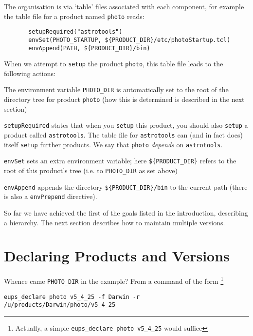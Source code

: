 \documentclass{article}
\newcommand{\code}[1]{\texttt{#1}}
\begin{document}
The organisation is via `table' files
associated with each component, for example the table file
for a product named \code{photo} reads:
\begin{verbatim}
       setupRequired("astrotools")
       envSet(PHOTO_STARTUP, ${PRODUCT_DIR}/etc/photoStartup.tcl)
       envAppend(PATH, ${PRODUCT_DIR}/bin)
\end{verbatim}

When we attempt to \code{setup} the product \code{photo}, this
table file leads to the following actions:
\begin{description}
\item
  The environment variable \code{PHOTO\_DIR} is automatically set to 
  the root of the directory tree for product \code{photo} (how this
  is determined is described in the next section)
\item
  \code{setupRequired} states that when you \code{setup} this product, you
  should also \code{setup} a product called \code{astrotools}.
  The table file for \code{astrotools} can
  (and in fact does) itself \code{setup} further products.  We say that
  \code{photo} \emph{depends} on \code{astrotools}.
\item
  \code{envSet} sets an extra environment variable; here \code{\$\{PRODUCT\_DIR\}}
  refers to the root of this product's tree (i.e. to \code{PHOTO\_DIR} as set above)
\item
  \code{envAppend} appends
  the directory \code{\$\{PRODUCT\_DIR\}/bin} to the current path (there
  is also a \code{envPrepend} directive).
\end{description}

So far we have achieved the first of the goals listed in the introduction,
describing a hierarchy.  The next section describes how to maintain
multiple versions.

\section{Declaring Products and Versions}

Whence came \code{PHOTO\_DIR} in the example? From a command of the form
\footnote{Actually, a simple \code{eups\_declare photo v5\_4\_25} would suffice}
\begin{verbatim}
eups_declare photo v5_4_25 -f Darwin -r /u/products/Darwin/photo/v5_4_25
\end{verbatim}
\end{document}
